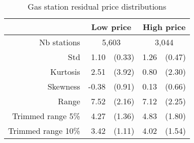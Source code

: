 \documentclass[english]{article}
\begin{document}
\begin{table}[!h]
  \caption{Gas station residual price distributions}
	\label{tab:station_price_support_stats_des}
\begin{tabular}{rrrrr}
\hline
\hline
      & \multicolumn{2}{c}{Low price} & \multicolumn{2}{c}{High price} \\
\hline
Nb stations & \multicolumn{2}{c}{5,603} & \multicolumn{2}{c}{3,044} \\
Std   & 1.10  & (0.33) & 1.26  & (0.47) \\
Kurtosis & 2.51  & (3.92) & 0.80  & (2.30) \\
Skewness & -0.38 & (0.91) & 0.13  & (0.66) \\
Range & 7.52  & (2.16) & 7.12  & (2.25) \\
Trimmed range 5\% & 4.27  & (1.36) & 4.83  & (1.80) \\
Trimmed range 10\% & 3.42  & (1.11) & 4.02  & (1.54) \\
\hline
\hline
\end{tabular}
\end{table}
\end{document}
